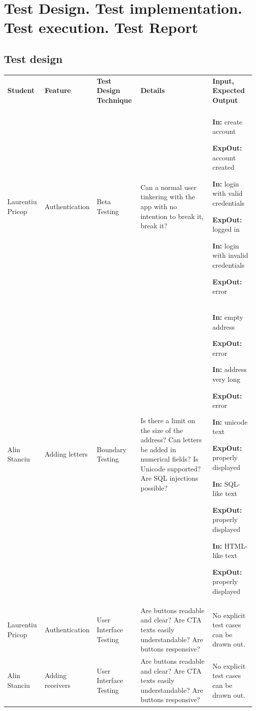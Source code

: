 \documentclass{article}
\begin{document}
\section{Test Design. Test implementation. Test execution. Test Report}

\subsection{Test design}

\begin{longtabu}{X[1] X[1]|X[1] X[2] X[2]}
    \hline
    \textbf{Student} & \textbf{Feature} & \textbf{Test Design Technique} & \textbf{Details} & \textbf{Input, Expected Output} \\
    &&&&\\
    \hline
    \endhead
    Laurentiu Pricop & Authenti\-cation & Beta Testing & Can a normal user tinkering with the app with no intention to break it, break it? &
    \par \textbf{In:} create account
    \par \textbf{ExpOut:} account created
    \par \textbf{In:} login with valid credentials
    \par \textbf{ExpOut:} logged in
    \par \textbf{In:} login with invalid credentials
    \par \textbf{ExpOut:} error
    \\
    \hline
    Alin Stanciu & Adding letters & Boundary Testing & Is there a limit on the size of the address? Can letters be added in numerical fields? Is Unicode supported? Are SQL injections possible? &
    \par \textbf{In:} empty address
    \par \textbf{ExpOut:} error
    \par \textbf{In:} address very long
    \par \textbf{ExpOut:} error
    \par \textbf{In:} unicode text
    \par \textbf{ExpOut:} properly displayed
    \par \textbf{In:} SQL-like text
    \par \textbf{ExpOut:} properly displayed
    \par \textbf{In:} HTML-like text
    \par \textbf{ExpOut:} properly displayed
    \\
    \hline
    Laurentiu Pricop & Authenti\-cation & User Interface Testing & Are buttons readable and clear? Are CTA texts easily understandable? Are buttons responsive? &
    No explicit test cases can be drawn out.\\
    \hline
    Alin Stanciu & Adding receivers & User Interface Testing & Are buttons readable and clear? Are CTA texts easily understandable? Are buttons responsive? &
    No explicit test cases can be drawn out.
    \\
    \hline
\end{longtabu}
\end{document}
